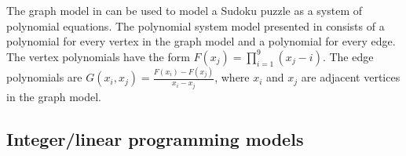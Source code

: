 The graph model in \cite{gagovargaset} can be used to model a Sudoku puzzle as a system of polynomial equations. The polynomial system model presented in \cite{gagovargaset} consists of a polynomial for every vertex in the graph model and a polynomial for every edge. The vertex polynomials have the form $F(x_j) = \prod_{i=1}^{9} (x_j - i)$. The edge polynomials are $G(x_i, x_j) = \frac{F(x_i) - F(x_j)}{x_i - x_j}$, where $x_i$ and $x_j$ are adjacent vertices in the graph model. 

\subsection{Integer/linear programming models}
\label{sec:models:lp}


